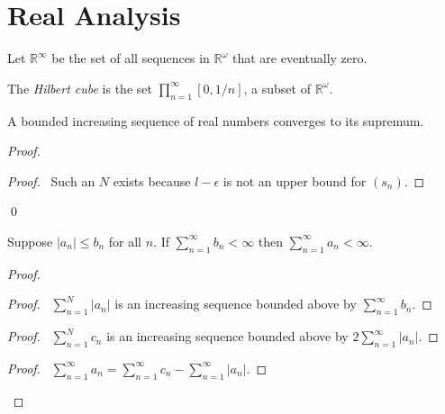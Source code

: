 \chapter{Real Analysis}

\begin{df}
  Let $\mathbb{R}^\infty$ be the set of all sequences in $\mathbb{R}^\omega$ that are eventually zero.
\end{df}

\begin{df}
  The \emph{Hilbert cube} is the set $\prod_{n=1}^\infty [0, 1/n]$, a subset of $\mathbb{R}^\omega$.
\end{df}

\begin{prop}
  A bounded increasing sequence of real numbers converges to its supremum.
\end{prop}

\begin{proof}
  \pf
  \begin{proof}
    \pf\ Such an $N$ exists because $l - \epsilon$ is not an upper bound for $(s_n)$.
  \end{proof}
  \qed
\end{proof}

\begin{prop}
  Suppose $|a_n| \leq b_n$ for all $n$. If $\sum_{n=1}^\infty b_n < \infty$ then $\sum_{n=1}^\infty a_n < \infty$.
\end{prop}

\begin{proof}
  \pf
  \begin{proof}
    \pf\ $\sum_{n=1}^N |a_n|$ is an increasing sequence bounded above by $\sum_{n=1}^\infty b_n$.
  \end{proof}
  \begin{proof}
    \pf\ $\sum_{n=1}^N c_n$ is an increasing sequence bounded above by $2 \sum_{n=1}^\infty |a_n|$.
  \end{proof}
  \qedstep
  \begin{proof}
    \pf\ $\sum_{n=1}^\infty a_n = \sum_{n=1}^\infty c_n - \sum_{n=1}^\infty |a_n|$.
  \end{proof}
\end{proof}

